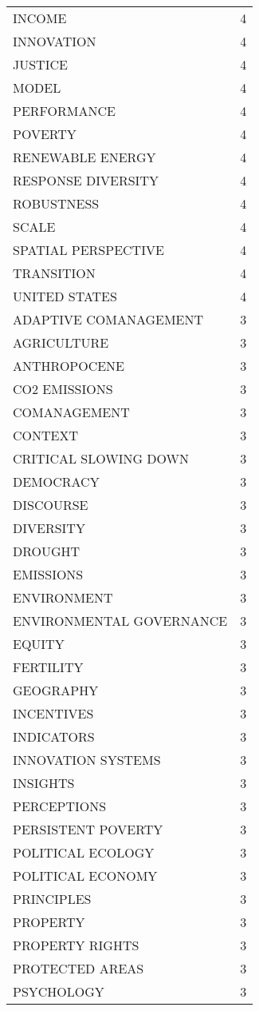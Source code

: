 \documentclass[]{article}
\begin{document}
\begin{longtable}{lc}
INCOME & 4 \\ 
INNOVATION & 4 \\ 
JUSTICE & 4 \\ 
MODEL & 4 \\ 
PERFORMANCE & 4 \\ 
POVERTY & 4 \\ 
RENEWABLE ENERGY & 4 \\ 
RESPONSE DIVERSITY & 4 \\ 
ROBUSTNESS & 4 \\ 
SCALE & 4 \\ 
SPATIAL PERSPECTIVE & 4 \\ 
TRANSITION & 4 \\ 
UNITED STATES & 4 \\ 
ADAPTIVE COMANAGEMENT & 3 \\ 
AGRICULTURE & 3 \\ 
ANTHROPOCENE & 3 \\ 
CO2 EMISSIONS & 3 \\ 
COMANAGEMENT & 3 \\ 
CONTEXT & 3 \\ 
CRITICAL SLOWING DOWN & 3 \\ 
DEMOCRACY & 3 \\ 
DISCOURSE & 3 \\ 
DIVERSITY & 3 \\ 
DROUGHT & 3 \\ 
EMISSIONS & 3 \\ 
ENVIRONMENT & 3 \\ 
ENVIRONMENTAL GOVERNANCE & 3 \\ 
EQUITY & 3 \\ 
FERTILITY & 3 \\ 
GEOGRAPHY & 3 \\ 
INCENTIVES & 3 \\ 
INDICATORS & 3 \\ 
INNOVATION SYSTEMS & 3 \\ 
INSIGHTS & 3 \\ 
PERCEPTIONS & 3 \\ 
PERSISTENT POVERTY & 3 \\ 
POLITICAL ECOLOGY & 3 \\ 
POLITICAL ECONOMY & 3 \\ 
PRINCIPLES & 3 \\ 
PROPERTY & 3 \\ 
PROPERTY RIGHTS & 3 \\ 
PROTECTED AREAS & 3 \\ 
PSYCHOLOGY & 3 \\ 

\end{longtable}
\end{document}
